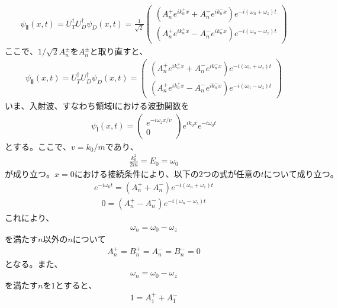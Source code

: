 \begin{align}
{\psi}_{Ⅱ}(x,t)=U_{T}^{\dagger}U_{D}^{\dagger}{\psi}_{D}(x,t)=\frac{1}{\sqrt{2}}
\begin{pmatrix}
\left(A_{n}^{+}e^{ik_{n}^{+}x}+A_{n}^{-}e^{ik_{n}^{-}x}\right)e^{-i(\omega_{n}+\omega_{z})t} \\
\left(A_{n}^{+}e^{ik_{n}^{+}x}-A_{n}^{-}e^{ik_{n}^{-}x}\right)e^{-i(\omega_{n}-\omega_{z})t}
\end{pmatrix}
\end{align}
$ここで、1/{\sqrt{2}}A_{n}^{\pm}をA_{n}^{\pm}と取り直すと、$
\begin{align}
{\psi}_{Ⅱ}(x,t)=U_{T}^{\dagger}U_{D}^{\dagger}{\psi}_{D}(x,t)=
\begin{pmatrix}
\left(A_{n}^{+}e^{ik_{n}^{+}x}+A_{n}^{-}e^{ik_{n}^{-}x}\right)e^{-i(\omega_{n}+\omega_{z})t} \\
\left(A_{n}^{+}e^{ik_{n}^{+}x}-A_{n}^{-}e^{ik_{n}^{-}x}\right)e^{-i(\omega_{n}-\omega_{z})t}
\end{pmatrix}
\end{align}
いま、入射波、すなわち領域Ⅰにおける波動関数を
\begin{align}
{\psi}_{Ⅰ}(x,t)=
\begin{pmatrix}
e^{-i\omega_{z}x/v} \\
0
\end{pmatrix}
e^{ik_{0}x}e^{-i\omega_{0}t}
\end{align}
$とする。ここで、v={k_{0}}/{m}であり、$
\begin{align}
\frac{k_{0}^2}{2m}=E_{0}=\omega_{0}
\end{align}
$が成り立つ。x=0における接続条件により、以下の2つの式が任意のtについて成り立つ。$
\begin{align}
e^{-i\omega_{0}t}=\left(A_{n}^{+}+A_{n}^{-}\right)e^{-i(\omega_{n}+\omega_{z})t}
\end{align}
\begin{align}
0=\left(A_{n}^{+}-A_{n}^{-}\right)e^{-i(\omega_{n}-\omega_{z})t}
\end{align}
これにより、
\begin{align}
\omega_{n}=\omega_{0}-\omega_{z}
\end{align}
$を満たすn以外のnについて$
\begin{align}
A_{n}^{+}=B_{n}^{+}=A_{n}^{-}=B_{n}^{-}=0
\end{align}
となる。また、
\begin{align}
\omega_{n}=\omega_{0}-\omega_{z}
\end{align}
$を満たすnを1とすると、$
\begin{align}
1=A_{1}^{+}+A_{1}^{-}
\end{align}
